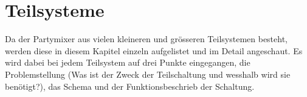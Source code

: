 \section{Teilsysteme}
\label{sec:Teilsysteme}

Da der Partymixer aus vielen kleineren und grösseren Teilsystemen besteht, werden diese in diesem Kapitel einzeln aufgelistet und im Detail angeschaut.
Es wird dabei bei jedem Teilsystem auf drei Punkte eingegangen, die Problemstellung (Was ist der Zweck der Teilschaltung und wesshalb wird sie benötigt?), das Schema und der Funktionsbeschrieb der Schaltung.